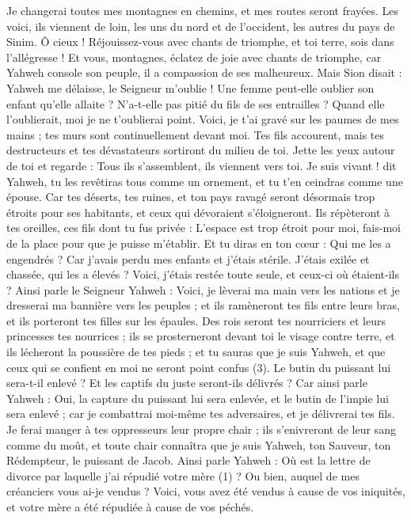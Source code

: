 \begin{multicols}{2}
Je changerai toutes mes montagnes en chemins, et mes routes seront frayées.
Les voici, ils viennent de loin, les uns du nord et de l’occident, les autres du pays de Sinim.
Ô cieux ! Réjouissez-vous avec chants de triomphe, et toi terre, sois dans l’allégresse ! Et vous, montagnes, éclatez de joie avec chants de triomphe, car Yahweh console son peuple, il a compassion de ses malheureux.
Mais Sion disait : Yahweh me délaisse, le Seigneur m’oublie !
Une femme peut-elle oublier son enfant qu'elle allaite ? N’a-t-elle pas pitié du fils de ses entrailles ? Quand elle l’oublierait, moi je ne t’oublierai point.
Voici, je t'ai gravé sur les paumes de mes mains ; tes murs sont continuellement devant moi.
Tes fils accourent, mais tes destructeurs et tes dévastateurs sortiront du milieu de toi.
Jette les yeux autour de toi et regarde : Tous ils s’assemblent, ils viennent vers toi. Je suis vivant ! dit Yahweh, tu les revêtiras tous comme un ornement, et tu t'en ceindras comme une épouse.
Car tes déserts, tes ruines, et ton pays ravagé seront désormais trop étroits pour ses habitants, et ceux qui dévoraient s'éloigneront.
Ils répèteront à tes oreilles, ces fils dont tu fus privée : L’espace est trop étroit pour moi, fais-moi de la place pour que je puisse m’établir.
Et tu diras en ton cœur : Qui me les a engendrés ? Car j'avais perdu mes enfants et j'étais stérile. J’étais exilée et chassée, qui les a élevés ? Voici, j'étais restée toute seule, et ceux-ci où étaient-ils ?
Ainsi parle le Seigneur Yahweh : Voici, je lèverai ma main vers les nations et je dresserai ma bannière vers les peuples ; et ils ramèneront tes fils entre leurs bras, et ils porteront tes filles sur les épaules.
Des rois seront tes nourriciers et leurs princesses tes nourrices ; ils se prosterneront devant toi le visage contre terre, et ils lécheront la poussière de tes pieds ; et tu sauras que je suis Yahweh, et que ceux qui se confient en moi ne seront point confus (3).
Le butin du puissant lui sera-t-il enlevé ? Et les captifs du juste seront-ils délivrés ?
Car ainsi parle Yahweh : Oui, la capture du puissant lui sera enlevée, et le butin de l’impie lui sera enlevé ; car je combattrai moi-même tes adversaires, et je délivrerai tes fils.
Je ferai manger à tes oppresseurs leur propre chair ; ils s'enivreront de leur sang comme du moût, et toute chair connaîtra que je suis Yahweh, ton Sauveur, ton Rédempteur, le puissant de Jacob.
\VerseOne{}Ainsi parle Yahweh : Où est la lettre de divorce par laquelle j’ai répudié votre mère (1) ? Ou bien, auquel de mes créanciers vous ai-je vendus ? Voici, vous avez été vendus à cause de vos iniquités, et votre mère a été répudiée à cause de vos péchés.

\end{multicols}
